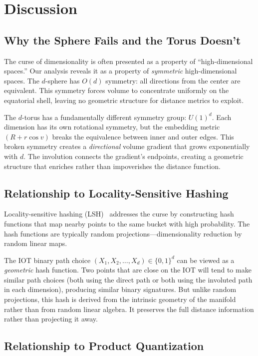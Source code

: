 \section{Discussion}
\label{sec:discussion}

\subsection{Why the Sphere Fails and the Torus Doesn't}

The curse of dimensionality is often presented as a property of ``high-dimensional spaces.'' Our analysis reveals it as a property of \emph{symmetric} high-dimensional spaces. The $d$-sphere has $O(d)$ symmetry: all directions from the center are equivalent. This symmetry forces volume to concentrate uniformly on the equatorial shell, leaving no geometric structure for distance metrics to exploit.

The $d$-torus has a fundamentally different symmetry group: $U(1)^d$. Each dimension has its own rotational symmetry, but the embedding metric $(R + r\cos v)$ breaks the equivalence between inner and outer edges. This broken symmetry creates a \emph{directional} volume gradient that grows exponentially with $d$. The involution connects the gradient's endpoints, creating a geometric structure that enriches rather than impoverishes the distance function.

\subsection{Relationship to Locality-Sensitive Hashing}

Locality-sensitive hashing (LSH)~\cite{indyk1998approximate} addresses the curse by constructing hash functions that map nearby points to the same bucket with high probability. The hash functions are typically random projections---dimensionality reduction by random linear maps.

The IOT binary path choice $(X_1, X_2, \ldots, X_d) \in \{0,1\}^d$ can be viewed as a \emph{geometric} hash function. Two points that are close on the IOT will tend to make similar path choices (both using the direct path or both using the involuted path in each dimension), producing similar binary signatures. But unlike random projections, this hash is derived from the intrinsic geometry of the manifold rather than from random linear algebra. It preserves the full distance information rather than projecting it away.

\subsection{Relationship to Product Quantization}

